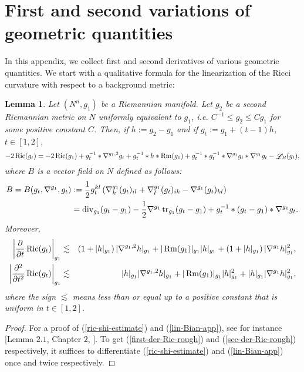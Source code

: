 \documentclass[a4paper,11pt,reqno]{amsart}
\newtheorem{lemma}[defn]{Lemma}
\def\Ric{\mathop{\rm Ric}\nolimits}
\def\Rm{\mathop{\rm Rm}\nolimits}
\def\tr{\mathop{\rm tr}\nolimits}
\def\div{\mathop{\rm div}\nolimits}
\def\Li{\mathop{\rm \mathscr{L}}\nolimits}
\def\Ric{\mathop{\rm Ric}\nolimits}
\def\Rm{\mathop{\rm Rm}\nolimits}
\def\tr{\mathop{\rm tr}\nolimits}
\def\div{\mathop{\rm div}\nolimits}
\def\Li{\mathop{\rm \mathscr{L}}\nolimits}
\numberwithin{equation}{section}
\begin{document}
	\section{First and second variations of geometric quantities}\label{app-C}
	In this appendix, we collect first and second derivatives of various geometric quantities.
	We start with a qualitative formula for the linearization of the Ricci curvature with respect to a background metric:
	\begin{lemma}\label{Ric-lin-lemma-app}
		Let $(N^n,g_1)$ be a Riemannian manifold. Let $g_2$ be a second Riemannian metric on $N$ uniformly equivalent to $g_1$, i.e. $C^{-1}\leq g_2\leq Cg_1$ for some positive constant $C$. Then, if $h:=g_2-g_1$ and if $g_t:=g_1+(t-1)h$, $t\in[1,2]$,
		\begin{equation}
		-2\Ric(g_t)=-2\Ric(g_1)+g_t^{-1}\ast\nabla^{g_1,2}g_t+g_t^{-1}\ast h\ast\Rm(g_1)+g_t^{-1}\ast g_t^{-1}\ast\nabla^{g_1}g_t\ast\nabla^{g_1}g_t-\Li_{B}(g_t),\label{ric-shi-estimate}
		\end{equation}
		where $B$ is a vector field on $N$ defined as follows:
		\begin{equation}
		\begin{split}
		B=B(g_t,\nabla^{g_1},g_t)&:=\frac{1}{2}g_t^{kl}\left(\nabla^{g_1}_k(g_t)_{il}+\nabla^{g_1}_l(g_t)_{ik}-\nabla^{g_1}(g_t)_{kl}\right)\\
		&=\div_{g_1}(g_t-g_1)-\frac{1}{2}\nabla^{g_1}\tr_{g_1}(g_t-g_1)+g_t^{-1}\ast(g_t-g_1)\ast\nabla^{g_1}g_t.\label{lin-Bian-app}
		\end{split}
		\end{equation}
		Moreover,
		\begin{eqnarray}
		\left|\frac{\partial}{\partial t}\Ric(g_t)\right|_{g_1}&\lesssim&\left(1+|h|_{g_1}\right)|\nabla^{g_1,2}h|_{g_1}+|\Rm(g_1)|_{g_1}|h|_{g_1}+\left(1+|h|_{g_1}\right)|\nabla^{g_1}h|_{g_1}^2,\label{first-der-Ric-rough}\\
		\left|\frac{\partial^2}{\partial t^2}\Ric(g_t)\right|_{g_1}&\lesssim& |h|_{g_1}|\nabla^{g_1,2}h|_{g_1}+|\Rm(g_1)|_{g_1}|h|^2_{g_1}+|h|_{g_1}|\nabla^{g_1}h|_{g_1}^2,\label{sec-der-Ric-rough}
		\end{eqnarray}
		where the sign $\lesssim$ means less than or equal up to a positive constant that is uniform in $t\in[1,2]$.
	\end{lemma}
	\begin{proof}
		For a proof of (\ref{ric-shi-estimate}) and (\ref{lin-Bian-app}), see for instance [Lemma $2.1$, Chapter $2$, \cite{Shi-Def}]. To get (\ref{first-der-Ric-rough}) and (\ref{sec-der-Ric-rough}) respectively, it suffices to differentiate (\ref{ric-shi-estimate}) and (\ref{lin-Bian-app}) once and twice respectively.
	\end{proof}
\end{document}
